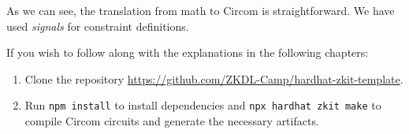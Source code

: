\documentclass[../lecture-notes.tex]{subfiles}
\begin{document}
    \begin{center}
        \vspace{-2mm}
        \vspace{-2mm}

    \end{center}

    As we can see, the translation from math to Circom is straightforward.
    We have used \textit{signals} for constraint definitions.

    \begin{remark}
        If you wish to follow along with the explanations in the following chapters:
        \begin{enumerate}
            \item Clone the repository \url{https://github.com/ZKDL-Camp/hardhat-zkit-template}.
            \item Run \texttt{npm install} to install dependencies and \texttt{npx hardhat zkit make}
            to compile Circom circuits and generate the necessary artifacts.
        \end{enumerate}
    \end{remark}
\end{document}
